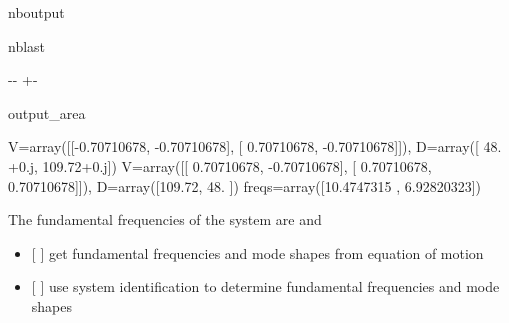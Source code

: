 \documentclass[letterpaper,10pt,english]{sphinxmanual}
\begin{document}
\begin{sphinxuseclass}{nboutput}
\begin{sphinxuseclass}{nblast}
{

\kern-\sphinxverbatimsmallskipamount\kern-\baselineskip
\kern+\FrameHeightAdjust\kern-\fboxrule
\vspace{\nbsphinxcodecellspacing}

\begin{sphinxuseclass}{output_area}
\begin{sphinxuseclass}{}


\begin{sphinxVerbatim}[commandchars=\\\{\}]
V=array([[-0.70710678, -0.70710678],
       [ 0.70710678, -0.70710678]]),
D=array([ 48.  +0.j, 109.72+0.j])
V=array([[ 0.70710678, -0.70710678],
       [ 0.70710678,  0.70710678]]),
D=array([109.72,  48.  ])
freqs=array([10.4747315 ,  6.92820323])
\end{sphinxVerbatim}



\end{sphinxuseclass}
\end{sphinxuseclass}
}

\end{sphinxuseclass}
\end{sphinxuseclass}
\sphinxAtStartPar
The fundamental frequencies of the system are  and 
\begin{itemize}
\item {} 
\sphinxAtStartPar
{[} {]} get fundamental frequencies and mode shapes from equation of motion

\item {} 
\sphinxAtStartPar
{[} {]} use system identification to determine fundamental frequencies and mode shapes

\end{itemize}
\end{document}
